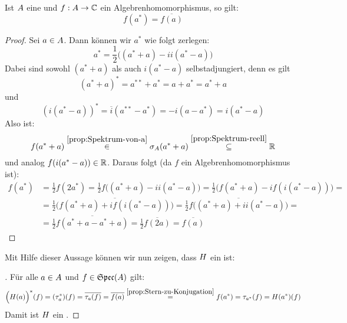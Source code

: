 \begin{prop}\label{prop:Stern-zu-Konjugation}
Ist $A$ eine \CAlg{} und $f: A \to \mathbb{C}$ ein Algebrenhomomorphismus, so gilt:
	\[f(a^*) = \overline{f(a)}\]
\end{prop}

\begin{proof}
Sei $a \in A$. Dann können wir $a^*$ wie folgt zerlegen:
	\[a^* = \frac{1}{2}\Big((a^* + a) - ii(a^* - a)\Big)\]
Dabei sind sowohl $(a^* + a)$ als auch $i(a^* - a)$ selbstadjungiert, denn es gilt
	\[(a^* + a)^* = a^{**} + a^* = a + a^* = a^* + a\]
und
	\[(i(a^* - a))^* = \overline{i}(a^{**} - a^*) = -i(a - a^*) = i(a^* - a)\]
Also ist:
	\[f(a^* + a) \overset{\ref{prop:Spektrum-von-a}}{\in} \sigma_A(a^* + a) \overset{\ref{prop:Spektrum-reell}}{\subseteq} \mathbb{R}\]
und analog $f(i(a^* - a)) \in \mathbb{R}$. Daraus folgt (da $f$ ein Algebrenhomomorphismus ist):
	\begin{align*}
	f(a^*) &= \frac{1}{2}f(2a^*) = \frac{1}{2}f\Big((a^* + a) - ii(a^* - a)\Big) = \frac{1}{2}\Big(f(a^* + a) - if(i(a^* - a))\Big) = \\
				&= \frac{1}{2}\Big(\overline{f(a^* + a) + if(i(a^* - a))}\Big) = \frac{1}{2}\overline{f\Big((a^* + a) + ii(a^* - a)\Big)} = \\
				&= \frac{1}{2}\overline{f(a^* + a - a^* + a)} = \frac{1}{2}\overline{f(2a)} = \overline{f(a)}
	\end{align*}
\end{proof}

Mit Hilfe dieser Aussage können wir nun zeigen, dass $\AlgIso$ ein \CAlgHom{} ist:

\begin{proof}[\Bew{$\AlgIso$ \CAlgHom}]Für alle $a \in A$ und $f \in \mathfrak{Spec}(A)$ gilt:
	\[\Big(H(a)\Big)^*(f) = (\tau_a^*)(f) = \overline{\tau_a(f)} = \overline{f(a)} \overset{\ref{prop:Stern-zu-Konjugation}}{=} f(a^*) = \tau_{a^*}(f) = H(a^*)(f) \]
	Damit ist $\AlgIso$ ein \CAlgHom.
\let\qed\relax
\end{proof}